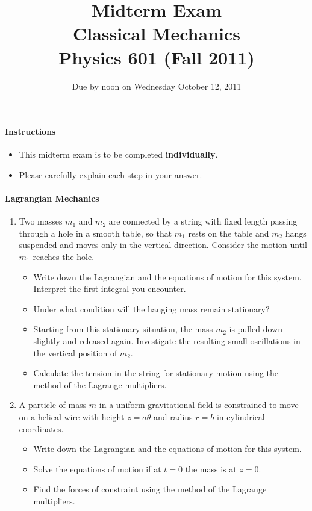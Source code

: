 \documentclass[letterpaper,11pt]{article}
\title{Midterm Exam \\ Classical Mechanics \\ Physics 601 (Fall 2011)}
\date{Due by noon on Wednesday October 12, 2011}
\begin{document}
\maketitle

\paragraph*{Instructions}
\begin{itemize}
 \item This midterm exam is to be completed \textbf{individually}.
 \item Please carefully explain each step in your answer.
\end{itemize}

\paragraph*{Lagrangian Mechanics}
\begin{enumerate}
 \item Two masses $m_1$ and $m_2$ are connected by a string with fixed length passing through a hole in a smooth table, so that $m_1$ rests on the table and $m_2$ hangs suspended and moves only in the vertical direction.  Consider the motion until $m_1$ reaches the hole.
 \begin{itemize}
  \item Write down the Lagrangian and the equations of motion for this system. Interpret the first integral you encounter.
  \item Under what condition will the hanging mass remain stationary?
  \item Starting from this stationary situation, the mass $m_2$ is pulled down slightly and released again. Investigate the resulting small oscillations in the vertical position of $m_2$.
  \item Calculate the tension in the string for stationary motion using the method of the Lagrange multipliers.
 \end{itemize}
 \item A particle of mass $m$ in a uniform gravitational field is constrained to move on a helical wire with height $z = a\theta$ and radius $r = b$ in cylindrical coordinates.
 \begin{itemize}
  \item Write down the Lagrangian and the equations of motion for this system.
  \item Solve the equations of motion if at $t = 0$ the mass is at $z = 0$.
  \item Find the forces of constraint using the method of the Lagrange multipliers.
 \end{itemize}
\end{enumerate}
\end{document}
